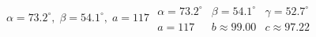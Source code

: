 { $\alpha = 73.2^{\circ}, \; \beta = 54.1^{\circ}, \; a = 117$}
{$\begin{array}{lll}\alpha = 73.2^{\circ} & \beta = 54.1^{\circ} & \gamma = 52.7^{\circ} \\a = 117 & b \approx 99.00 & c \approx 97.22 \end{array}$}
